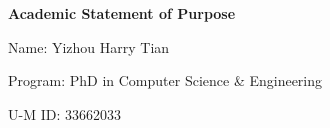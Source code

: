 \vspace*{3mm}

\noindent \textbf{Academic Statement of Purpose}

\noindent Name: Yizhou Harry Tian 

\noindent Program: PhD in Computer Science \& Engineering

\noindent U-M ID: 33662033

\vspace*{3mm}

